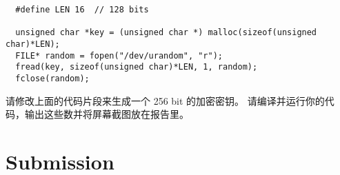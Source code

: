 \begin{lstlisting}
  #define LEN 16  // 128 bits

  unsigned char *key = (unsigned char *) malloc(sizeof(unsigned char)*LEN);
  FILE* random = fopen("/dev/urandom", "r");
  fread(key, sizeof(unsigned char)*LEN, 1, random);
  fclose(random);
\end{lstlisting}


请修改上面的代码片段来生成一个 256 bit 的加密密钥。
请编译并运行你的代码，输出这些数并将屏幕截图放在报告里。




\section{Submission}





